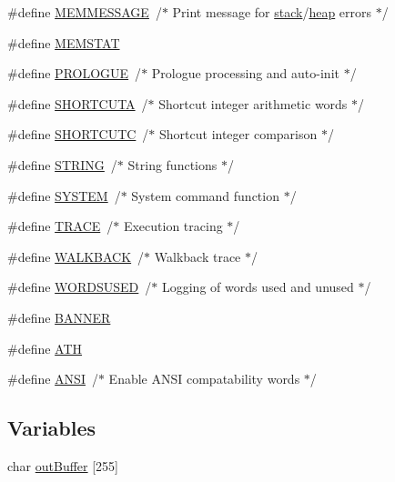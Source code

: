 \begin{DoxyCompactItemize}
\item 
\#define \hyperlink{small-linux-atlcfig_8h_a3a12ced9ae9a894dbc0a31282e769d63}{M\+E\+M\+M\+E\+S\+S\+A\+GE}~/$\ast$ Print message for \hyperlink{FreeRTOS_2atlast_8c_a119bff668c1f986f35cdc8a167c756bb}{stack}/\hyperlink{FreeRTOS_2atlast_8c_a631c4c438b300c6392fe526a50a041c3}{heap} errors $\ast$/
\item 
\#define \hyperlink{small-linux-atlcfig_8h_a90dbf4dc4f15c07ffcf27e0b757187a7}{M\+E\+M\+S\+T\+AT}
\item 
\#define \hyperlink{small-linux-atlcfig_8h_a59f8a4119207355f67b920d35ec6cc8e}{P\+R\+O\+L\+O\+G\+UE}~/$\ast$ Prologue processing and auto-\/init $\ast$/
\item 
\#define \hyperlink{small-linux-atlcfig_8h_ae957ba08823687327a6f74f8ba99cf01}{S\+H\+O\+R\+T\+C\+U\+TA}~/$\ast$ Shortcut integer arithmetic words $\ast$/
\item 
\#define \hyperlink{small-linux-atlcfig_8h_a7fb6c8bc5e9315d6ad8ecc8f29d22a9a}{S\+H\+O\+R\+T\+C\+U\+TC}~/$\ast$ Shortcut integer comparison $\ast$/
\item 
\#define \hyperlink{small-linux-atlcfig_8h_a0f4d394a3ab4e09bff60f714c66dc5ee}{S\+T\+R\+I\+NG}~/$\ast$ String functions $\ast$/
\item 
\#define \hyperlink{small-linux-atlcfig_8h_a21b97df85e65556468b28a576311271c}{S\+Y\+S\+T\+EM}~/$\ast$ System command function $\ast$/
\item 
\#define \hyperlink{small-linux-atlcfig_8h_aad9cc64d45a76ba0d37c00f8cd9caa37}{T\+R\+A\+CE}~/$\ast$ Execution tracing $\ast$/
\item 
\#define \hyperlink{small-linux-atlcfig_8h_a8a545fc997e24de1bdccb3454442ddee}{W\+A\+L\+K\+B\+A\+CK}~/$\ast$ Walkback trace $\ast$/
\item 
\#define \hyperlink{small-linux-atlcfig_8h_a1832f63df1cc6543af5e3de731b77dac}{W\+O\+R\+D\+S\+U\+S\+ED}~/$\ast$ Logging of words used and unused $\ast$/
\item 
\#define \hyperlink{small-linux-atlcfig_8h_a46c1fb0f4185dc45eda625530bc0fd73}{B\+A\+N\+N\+ER}
\item 
\#define \hyperlink{small-linux-atlcfig_8h_a55fc4596d1f1291f82c8574e9e4a8369}{A\+TH}
\item 
\#define \hyperlink{small-linux-atlcfig_8h_a9382b15380bf4f6adaafd94f1c78991a}{A\+N\+SI}~/$\ast$ Enable A\+N\+SI compatability words $\ast$/
\end{DoxyCompactItemize}
\subsection*{Variables}
\begin{DoxyCompactItemize}
\item 
char \hyperlink{small-linux-atlcfig_8h_a2f25dee1596892b07e30dd78f5ebe81b}{out\+Buffer} \mbox{[}255\mbox{]}
\end{DoxyCompactItemize}


